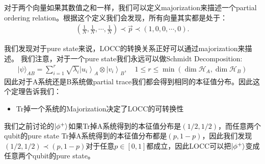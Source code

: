 对于两个向量如果其数值之和一样，我们可以定义majorization来描述一个partial ordering
relation。根据这个定义我们会发现，所有向量其实都是处于：
\begin{align}
  (\frac{1}{N},\frac{1}{N},\cdots,\frac{1}{N})\prec\vec{p}\prec
  (1,0,0,\cdots,0).
\end{align}

\bigskip
{}

我们发现对于pure state来说，LOCC的转换关系正好可以通过majorization来描述。
我们注意，对于一个pure state我们永远可以做Schmidt Decomposition:
\begin{align}
  |\psi\rangle_{AB}=\sum_{i=1}^r\sqrt{\lambda_i}\left|u_i\right\rangle_A\otimes\left|v_i\right\rangle_B
  , \quad 1\leq r\leq\min(\dim\mathcal{H}_A,\dim\mathcal{H}_B)
\end{align}
因此对于A系统还是B系统做partial trace我们都会得到相同的本征值分布。因此这个定理告诉我们：
\begin{itemize}
  \item Tr掉一个系统的Majorization决定了LOCC的可转换性
\end{itemize}
我们之前讨论的$ \left| \phi^+ \right\rangle $如果Tr掉A系统得到的本征值分布是$ (1/2,1/2) $，而任意两个qubit的pure
state Tr掉A系统得到的本征值分布都是$ (p,1-p) $，因此我们发现$ (1/2,1/2)\prec(p,1-p)
$对于任意$ p\in[0,1] $都成立，因此LOCC可以把$ \left| \phi^+ \right\rangle $变成任意两个qubit的pure state。

